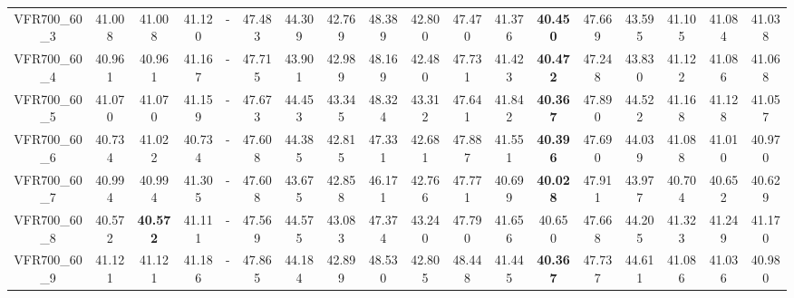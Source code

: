 \begin{tabular}{cc|ccc|ccccccccccccc}
VFR700\_60\_3      & 41.008           & 41.008           & 41.120           & -                & 47.483           & 44.309           & 42.769           & 48.389           & 42.800           & 47.470           & 41.376           & {\bf 40.450}     & 47.669           & 43.595           & 41.105           & 41.084           & 41.038          \\ 
VFR700\_60\_4      & 40.961           & 40.961           & 41.167           & -                & 47.715           & 43.901           & 42.989           & 48.169           & 42.480           & 47.731           & 41.423           & {\bf 40.472}     & 47.248           & 43.830           & 41.122           & 41.086           & 41.068          \\ 
VFR700\_60\_5      & 41.070           & 41.070           & 41.159           & -                & 47.673           & 44.453           & 43.345           & 48.324           & 43.312           & 47.641           & 41.842           & {\bf 40.367}     & 47.890           & 44.522           & 41.168           & 41.128           & 41.057          \\ 
VFR700\_60\_6      & 40.734           & 41.022           & 40.734           & -                & 47.608           & 44.385           & 42.815           & 47.331           & 42.681           & 47.887           & 41.551           & {\bf 40.396}     & 47.690           & 44.039           & 41.088           & 41.010           & 40.970          \\ 
VFR700\_60\_7      & 40.994           & 40.994           & 41.305           & -                & 47.608           & 43.675           & 42.858           & 46.171           & 42.766           & 47.771           & 40.699           & {\bf 40.028}     & 47.911           & 43.977           & 40.704           & 40.652           & 40.629          \\ 
VFR700\_60\_8      & 40.572           & {\bf 40.572}     & 41.111           & -                & 47.569           & 44.575           & 43.083           & 47.374           & 43.240           & 47.790           & 41.656           & 40.650           & 47.668           & 44.205           & 41.323           & 41.249           & 41.170          \\ 
VFR700\_60\_9      & 41.121           & 41.121           & 41.186           & -                & 47.865           & 44.184           & 42.899           & 48.530           & 42.805           & 48.448           & 41.445           & {\bf 40.367}     & 47.737           & 44.611           & 41.086           & 41.036           & 40.980          \\ 

\end{tabular}
